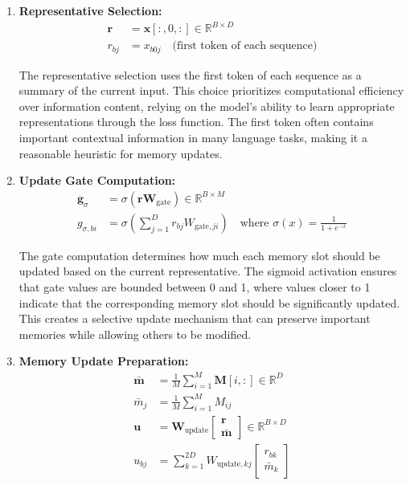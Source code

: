 \documentclass{article}
\begin{document}
\begin{enumerate}
\item \textbf{Representative Selection:}
\begin{align}
\mathbf{r} &= \mathbf{x}[:, 0, :] \in \mathbb{R}^{B \times D} \\
r_{bj} &= x_{b0j} \quad \text{(first token of each sequence)}
\end{align}

The representative selection uses the first token of each sequence as a summary of the current input. This choice prioritizes computational efficiency over information content, relying on the model's ability to learn appropriate representations through the loss function. The first token often contains important contextual information in many language tasks, making it a reasonable heuristic for memory updates.

\item \textbf{Update Gate Computation:}
\begin{align}
\mathbf{g}_\sigma &= \sigma(\mathbf{r} \mathbf{W}_{\text{gate}}) \in \mathbb{R}^{B \times M} \\
g_{\sigma,bi} &= \sigma\left(\sum_{j=1}^{D} r_{bj} W_{\text{gate},ji}\right) \quad \text{where } \sigma(x) = \frac{1}{1 + e^{-x}}
\end{align}

The gate computation determines how much each memory slot should be updated based on the current representative. The sigmoid activation ensures that gate values are bounded between 0 and 1, where values closer to 1 indicate that the corresponding memory slot should be significantly updated. This creates a selective update mechanism that can preserve important memories while allowing others to be modified.

\item \textbf{Memory Update Preparation:}
\begin{align}
\bar{\mathbf{m}} &= \frac{1}{M}\sum_{i=1}^{M} \mathbf{M}[i, :] \in \mathbb{R}^{D} \\
\bar{m}_j &= \frac{1}{M}\sum_{i=1}^{M} M_{ij} \\
\mathbf{u} &= \mathbf{W}_{\text{update}} \begin{bmatrix} \mathbf{r} \\ \bar{\mathbf{m}} \end{bmatrix} \in \mathbb{R}^{B \times D} \\
u_{bj} &= \sum_{k=1}^{2D} W_{\text{update},kj} \begin{bmatrix} r_{bk} \\ \bar{m}_k \end{bmatrix}
\end{align}


\end{enumerate}
\end{document}
